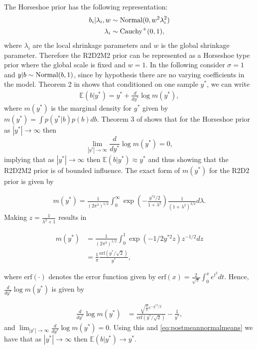 The Horseshoe prior \citep{HorseshoeProceedings} has the following representation:
\begin{align*}
    b_i | \lambda_i, w &\sim \text{Normal}(0, w^2 \lambda_i^2)\\
    \lambda_i &\sim \text{Cauchy}^+(0,1),
\end{align*}
where $\lambda_i$ are the local shrinkage parameters and $w$ is the global shrinkage parameter. Therefore the R2D2M2 prior can be represented as a Horseshoe type prior where the global scale is fixed and $w=1$. In the following consider $\sigma=1$ and $y|b \sim  \text{Normal}(b,1)$, since by hypothesis there are no varying coefficients in the model. Theorem 2 in \cite{Horseshoe} shows that conditioned on one sample $y^*$, we can write
\begin{align}
\label{eq:postmeannormalmeans}
    \mathbb{E}(b|y^*)= y^*+ \frac{d}{dy^*}\log m(y^*),
\end{align}
where $m(y^*)$ is the marginal density for $y^*$ given by $m(y^*)=\int p(y^*|b) p(b) db$. Theorem 3 of \cite{Horseshoe} shows that for the Horseshoe prior as $|y^*|\to \infty$ then $$\lim\limits_{|y^*|\to \infty} \frac{d}{dy^*} \log m(y^*)=0,$$
implying that as $|y^*|\to \infty$ then $\mathbb{E}(b|y^*)\approx y^*$ and thus showing that the R2D2M2 prior is of bounded influence. The exact form of $m(y^*)$ for the R2D2 prior is given by

\begin{align*}
    m(y^*)= \frac{1}{(2\pi^3)^{1/2}} \int_0^\infty \exp \left( - \frac{y^{*2}/2}{1+\lambda^2}   \right) \frac{1}{(1+\lambda^2)^{3/2}} d\lambda.
\end{align*}
Making $z=\frac{1}{\lambda^2+1}$ results in

\begin{align*}
    m(y^*)&= \frac{1}{(2\pi^3)^{1/2}} \int_0^1 \exp \left(  -1/2 y^{*2} z   \right) z^{-1/2} dz \\
    &= \frac{1}{\pi } \frac{ \text{erf} \left(y^* / \sqrt{2} \right)}{y^*},
\end{align*}

where $\text{erf}(\cdot)$ denotes the error function given by $\text{erf}(x)= \frac{2}{\sqrt{\pi}} \int_0^x e^{t^2} dt$. Hence, $\frac{d}{dy^*}\log m(y^*)$ is given by

\begin{align*}
    \frac{d}{dy^*}\log m(y^*)&= \frac{ \sqrt{\frac{2}{\pi}} e^{- y^{*2}/2 }} { \text{erf}\left(y^* / \sqrt{2} \right)} -\frac{1}{y^*},
\end{align*}
and $\lim_{|y^*|\to \infty} \frac{d}{dy^*}\log m(y^*)=0$. Using this and \eqref{eq:postmeannormalmeans} we have that as $|y^*|\to \infty $ then $\mathbb{E}(b|y^*) \to y^*$.
